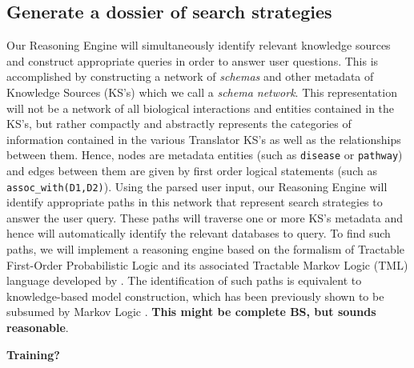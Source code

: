 \documentclass[11pt,notitlepage]{article}
\begin{document}
\subsection{Generate a dossier of search strategies}
\label{section:strategies}
Our Reasoning Engine will simultaneously identify relevant knowledge sources and construct appropriate queries in order to answer user questions. This is accomplished by constructing a network of \textit{schemas} and other metadata of Knowledge Sources (KS's) which we call a \textit{schema network}. This representation will not be a network of all biological interactions and entities contained in the KS's, but rather compactly and abstractly represents the categories of information contained in the various Translator KS's as well as the relationships between them. Hence, nodes are metadata entities (such as \verb|disease| or \verb|pathway|) and edges between them are given by first order logical statements (such as \verb|assoc_with(D1,D2)|). Using the parsed user input, our Reasoning Engine will identify appropriate paths in this network that represent search strategies to answer the user query. These paths will traverse one or more KS's metadata and hence will automatically identify the relevant databases to query. To find such paths, we will implement a reasoning engine based on the formalism of Tractable First-Order Probabilistic Logic and its associated Tractable Markov Logic (TML) language developed by \citet{Domingos:2012wi}. The identification of such paths is equivalent to knowledge-based model construction, which has been previously shown to be subsumed by Markov Logic \cite{domingos20071}. \textbf{This might be complete BS, but sounds reasonable}.

\textbf{Training?}

\end{document}
